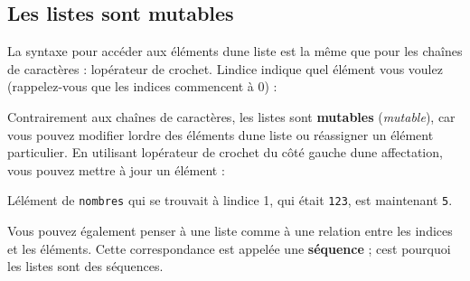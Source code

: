 \hypertarget{les-listes-sont-mutables}{%
\subsection{Les listes sont mutables}\label{les-listes-sont-mutables}}

La syntaxe pour accéder aux éléments d\textquotesingle une liste est la
même que pour les chaînes de caractères : l\textquotesingle opérateur de
crochet. L\textquotesingle indice indique quel élément vous voulez
(rappelez-vous que les indices commencent à 0) :

\begin{Shaded}
\begin{Highlighting}[]
\OperatorTok{\textgreater{}\textgreater{}\textgreater{}}\NormalTok{ devoirs[}\NormalTok{]}
\end{Highlighting}
\end{Shaded}

Contrairement aux chaînes de caractères, les listes sont
\textbf{mutables} (\emph{mutable}), car vous pouvez modifier
l\textquotesingle ordre des éléments d\textquotesingle une liste ou
réassigner un élément particulier. En utilisant
l\textquotesingle opérateur de crochet du côté gauche
d\textquotesingle une affectation, vous pouvez mettre à jour un élément
:

\begin{Shaded}
\begin{Highlighting}[]
\OperatorTok{\textgreater{}\textgreater{}\textgreater{}}\OperatorTok{=}\NormalTok{ [}\NormalTok{, }\NormalTok{]}
\OperatorTok{\textgreater{}\textgreater{}\textgreater{}}\NormalTok{ nombres[}\NormalTok{] }\OperatorTok{=} 
\OperatorTok{\textgreater{}\textgreater{}\textgreater{}}
\NormalTok{[}\NormalTok{, }\NormalTok{]}
\end{Highlighting}
\end{Shaded}

L\textquotesingle élément de \texttt{nombres} qui se trouvait à
l\textquotesingle indice 1, qui était \texttt{123}, est maintenant
\texttt{5}.

Vous pouvez également penser à une liste comme à une relation entre les
indices et les éléments. Cette correspondance est appelée une
\textbf{séquence} ; c\textquotesingle est pourquoi les listes sont des
séquences.

